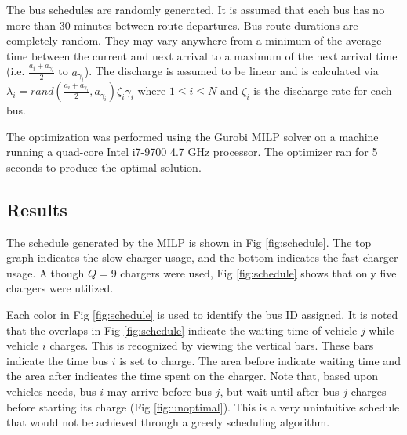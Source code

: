 \documentclass[letterpaper, 10pt, conference]{IEEEtran}
\begin{document}
The bus schedules are randomly generated. It is assumed that each bus has no more than 30 minutes between route departures. Bus route durations are completely random. They may vary anywhere from a minimum of the average time between the current and next arrival to a maximum of the next arrival time (i.e. $\frac{a_i + a_{\gamma_i}}{2}$ to $a_{\gamma_i}$). The discharge is assumed to be linear and is calculated via $\lambda_i = rand(\frac{a_i + a_{\gamma_i}}{2},a_{\gamma_i})\zeta_{i}{\gamma_i}$ where $1 \leq i \leq N$ and $\zeta_i$ is the discharge rate for each bus.

The optimization was performed using the Gurobi MILP solver \cite{Hespanha2018} on a machine running a quad-core Intel i7-9700 4.7 GHz processor. The optimizer ran for 5 seconds to produce the optimal solution.

\subsection{Results}
The schedule generated by the MILP is shown in Fig \ref{fig:schedule}. The top graph indicates the slow charger usage, and the bottom indicates the fast charger usage. Although $Q = 9$ chargers were used, Fig \ref{fig:schedule} shows that only five chargers were utilized. %

Each color in Fig \ref{fig:schedule} is used to identify the bus ID assigned. It is noted that the overlaps in Fig \ref{fig:schedule} indicate the waiting time of vehicle $j$ while vehicle $i$ charges. This is recognized by viewing the vertical bars. These bars indicate the time bus $i$ is set to charge. The area before indicate waiting time and the area after indicates the time spent on the charger. Note that, based upon vehicles needs, bus $i$ may arrive before bus $j$, but wait until after bus $j$ charges before starting its charge (Fig \ref{fig:unoptimal}). This is a very unintuitive schedule that would not be achieved through a greedy scheduling algorithm.
\end{document}
